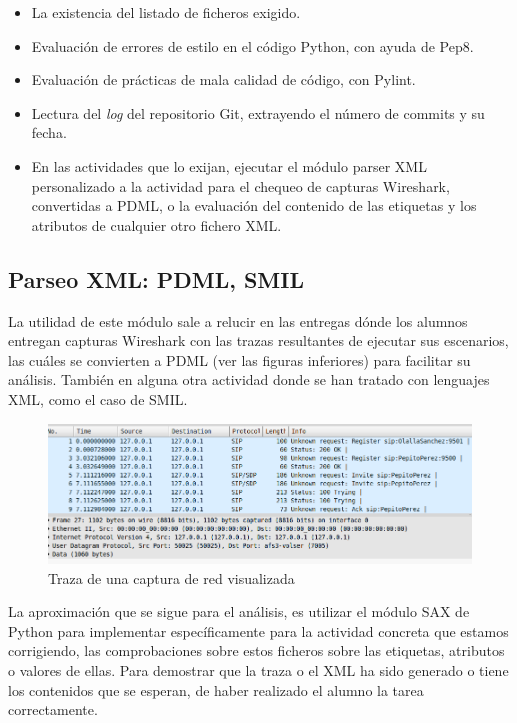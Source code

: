 \begin{itemize}
\item La existencia del listado de ficheros exigido.

\item Evaluación de errores de estilo en el código Python, con ayuda de Pep8.

\item Evaluación de prácticas de mala calidad de código, con Pylint.

\item Lectura del \textit{log} del repositorio Git, extrayendo el número de commits y su fecha.

\item En las actividades que lo exijan, ejecutar el módulo parser XML personalizado a la actividad para el chequeo de capturas Wireshark, convertidas a PDML, o la evaluación del contenido de las etiquetas y los atributos de cualquier otro fichero XML.
\end{itemize}


\subsection{Parseo XML: PDML, SMIL}
\label{sec:parseo}

La utilidad de este módulo sale a relucir en las entregas dónde los alumnos entregan capturas Wireshark con las trazas resultantes de ejecutar sus escenarios, las cuáles se convierten a PDML (ver las figuras inferiores) para facilitar su análisis. También en alguna otra actividad donde se han tratado con lenguajes XML, como el caso de SMIL.


\begin{figure}[H]
   \centering
   \includegraphics[width=16cm]{img/Selection_014_traza_wireshark}
   \caption{Traza de una captura de red visualizada}
   \label{figura:traza_wireshark}
\end{figure}


La aproximación que se sigue para el análisis, es utilizar el módulo SAX de Python para implementar específicamente para la actividad concreta que estamos corrigiendo, las comprobaciones sobre estos ficheros sobre las etiquetas, atributos o valores de ellas. Para demostrar que la traza o el XML ha sido generado o tiene los contenidos que se esperan, de haber realizado el alumno la tarea correctamente.\\


